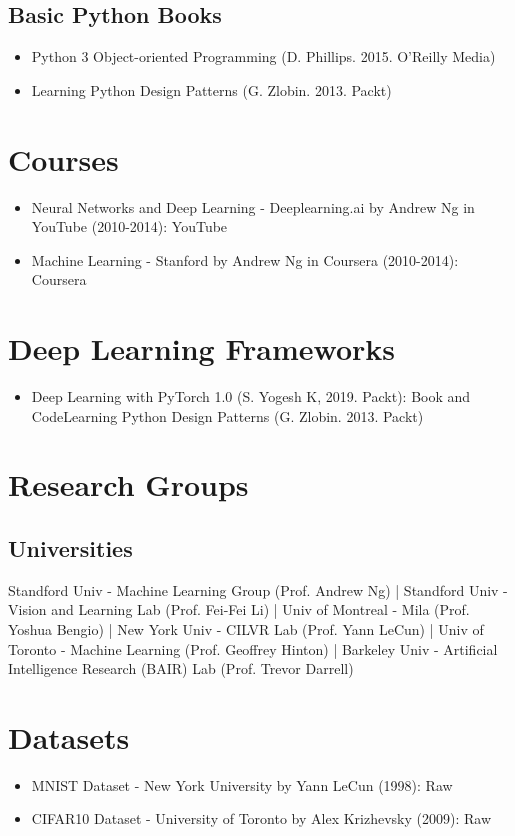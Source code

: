 \documentclass[12pt,oneside,a4paper]{article}
\begin{document}
\subsection{Basic Python Books}
\begin{itemize}
\item Python 3 Object-oriented Programming (D. Phillips. 2015. O'Reilly Media)
\item Learning Python Design Patterns (G. Zlobin. 2013. Packt)
\end{itemize}

\section{Courses}
\begin{itemize}
\item  Neural Networks and Deep Learning - Deeplearning.ai by Andrew Ng in YouTube (2010-2014): YouTube
\item Machine Learning - Stanford by Andrew Ng in Coursera (2010-2014): Coursera
\end{itemize}

\section{Deep Learning Frameworks}
\begin{itemize}
\item Deep Learning with PyTorch 1.0 (S. Yogesh K, 2019. Packt): Book and CodeLearning Python Design Patterns (G. Zlobin. 2013. Packt)
\end{itemize}

\section{Research Groups}
\subsection{Universities}
Standford Univ - Machine Learning Group (Prof. Andrew Ng) | Standford Univ - Vision and Learning Lab (Prof. Fei-Fei Li) | Univ of Montreal - Mila (Prof. Yoshua Bengio) | New York Univ - CILVR Lab (Prof. Yann LeCun) | Univ of Toronto - Machine Learning (Prof. Geoffrey Hinton) | Barkeley Univ - Artificial Intelligence Research (BAIR) Lab (Prof. Trevor Darrell)

\section{Datasets}
\begin{itemize}
\item MNIST Dataset - New York University by Yann LeCun (1998): Raw
\item CIFAR10 Dataset - University of Toronto by Alex Krizhevsky (2009): Raw
\end{itemize}
\end{document}
